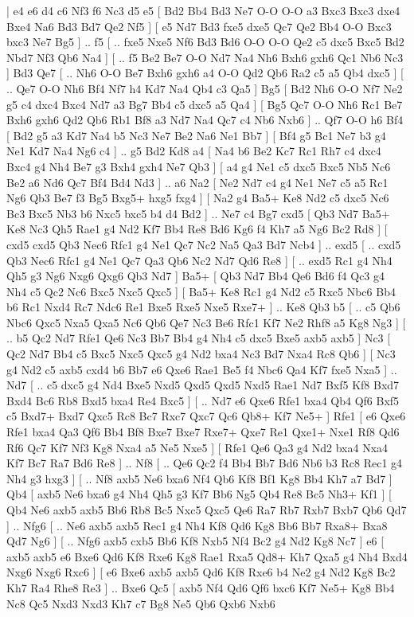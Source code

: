 \makegametitle 
|   e4   e6    d4   c6    Nf3   f6    Nc3   d5    e5 [  Bd2 Bb4  Bd3 Ne7  O-O O-O  a3 Bxc3  Bxc3 dxe4  Bxe4 Na6  Bd3 Bd7  Qe2 Nf5   ]  [  e5 Nd7  Bd3 fxe5  dxe5 Qc7  Qe2 Bb4  O-O Bxc3  bxc3 Ne7  Bg5   ] .. f5 [ .. fxe5  Nxe5 Nf6  Bd3 Bd6  O-O O-O  Qe2 c5  dxc5 Bxc5  Bd2 Nbd7  Nf3 Qb6  Na4   ]  [ .. f5  Be2 Be7  O-O Nd7  Na4 Nh6  Bxh6 gxh6  Qc1 Nb6  Nc3   ]  Bd3   Qe7 [ .. Nh6  O-O Be7  Bxh6 gxh6  a4 O-O  Qd2 Qb6  Ra2 c5  a5 Qb4  dxc5   ]  [ .. Qe7  O-O Nh6  Bf4 Nf7  h4 Kd7  Na4 Qb4  c3 Qa5   ]  Bg5 [  Bd2 Nh6  O-O Nf7  Ne2 g5  c4 dxc4  Bxc4 Nd7  a3 Bg7  Bb4 c5  dxc5 a5  Qa4   ]  [  Bg5 Qc7  O-O Nh6  Rc1 Be7  Bxh6 gxh6  Qd2 Qb6  Rb1 Bf8  a3 Nd7  Na4 Qc7  c4 Nb6  Nxb6   ] .. Qf7    O-O   h6    Bf4 [  Bd2 g5  a3 Kd7  Na4 b5  Nc3 Ne7  Be2 Na6  Ne1 Bb7   ]  [  Bf4 g5  Bc1 Ne7  b3 g4  Ne1 Kd7  Na4 Ng6  c4   ] .. g5    Bd2   Kd8    a4 [  Na4 b6  Be2 Kc7  Rc1 Rh7  c4 dxc4  Bxc4 g4  Nh4 Be7  g3 Bxh4  gxh4 Ne7  Qb3   ]  [  a4 g4  Ne1 c5  dxc5 Bxc5  Nb5 Nc6  Be2 a6  Nd6 Qc7  Bf4 Bd4  Nd3   ] .. a6    Na2 [  Ne2 Nd7  c4 g4  Ne1 Ne7  c5 a5  Rc1 Ng6  Qb3 Be7  f3 Bg5  Bxg5+ hxg5  fxg4   ]  [  Na2 g4  Ba5+ Ke8  Nd2 c5  dxc5 Nc6  Bc3 Bxc5  Nb3 b6  Nxc5 bxc5  b4 d4  Bd2   ] .. Ne7    c4   Bg7    cxd5 [  Qb3 Nd7  Ba5+ Ke8  Nc3 Qh5  Rae1 g4  Nd2 Kf7  Bb4 Re8  Bd6 Kg6  f4 Kh7  a5 Ng6  Bc2 Rd8   ]  [  cxd5 cxd5  Qb3 Nec6  Rfc1 g4  Ne1 Qc7  Nc2 Na5  Qa3 Bd7  Ncb4   ] .. exd5 [ .. cxd5  Qb3 Nec6  Rfc1 g4  Ne1 Qc7  Qa3 Qb6  Nc2 Nd7  Qd6 Re8   ]  [ .. exd5  Rc1 g4  Nh4 Qh5  g3 Ng6  Nxg6 Qxg6  Qb3 Nd7   ]  Ba5+ [  Qb3 Nd7  Bb4 Qe6  Bd6 f4  Qc3 g4  Nh4 c5  Qc2 Nc6  Bxc5 Nxc5  Qxc5   ]  [  Ba5+ Ke8  Rc1 g4  Nd2 c5  Rxc5 Nbc6  Bb4 b6  Rc1 Nxd4  Rc7 Ndc6  Re1 Bxe5  Rxe5 Nxe5  Rxe7+   ] .. Ke8    Qb3   b5 [ .. c5  Qb6 Nbc6  Qxc5 Nxa5  Qxa5 Nc6  Qb6 Qe7  Nc3 Be6  Rfc1 Kf7  Ne2 Rhf8  a5 Kg8  Ng3   ]  [ .. b5  Qc2 Nd7  Rfe1 Qe6  Nc3 Bb7  Bb4 g4  Nh4 c5  dxc5 Bxe5  axb5 axb5   ]  Nc3 [  Qc2 Nd7  Bb4 c5  Bxc5 Nxc5  Qxc5 g4  Nd2 bxa4  Nc3 Bd7  Nxa4 Rc8  Qb6   ]  [  Nc3 g4  Nd2 c5  axb5 cxd4  b6 Bb7  e6 Qxe6  Rae1 Be5  f4 Nbc6  Qa4 Kf7  fxe5 Nxa5   ] .. Nd7 [ .. c5  dxc5 g4  Nd4 Bxe5  Nxd5 Qxd5  Qxd5 Nxd5  Rae1 Nd7  Bxf5 Kf8  Bxd7 Bxd4  Bc6 Rb8  Bxd5 bxa4  Re4 Bxc5   ]  [ .. Nd7  e6 Qxe6  Rfe1 bxa4  Qb4 Qf6  Bxf5 c5  Bxd7+ Bxd7  Qxc5 Rc8  Bc7 Rxc7  Qxc7 Qc6  Qb8+ Kf7  Ne5+   ]  Rfe1 [  e6 Qxe6  Rfe1 bxa4  Qa3 Qf6  Bb4 Bf8  Bxe7 Bxe7  Rxe7+ Qxe7  Re1 Qxe1+  Nxe1 Rf8  Qd6 Rf6  Qc7 Kf7  Nf3 Kg8  Nxa4 a5  Ne5 Nxe5   ]  [  Rfe1 Qe6  Qa3 g4  Nd2 bxa4  Nxa4 Kf7  Bc7 Ra7  Bd6 Re8   ] .. Nf8 [ .. Qe6  Qc2 f4  Bb4 Bb7  Bd6 Nb6  b3 Rc8  Rec1 g4  Nh4 g3  hxg3   ]  [ .. Nf8  axb5 Ne6  bxa6 Nf4  Qb6 Kf8  Bf1 Kg8  Bb4 Kh7  a7 Bd7   ]  Qb4 [  axb5 Ne6  bxa6 g4  Nh4 Qh5  g3 Kf7  Bb6 Ng5  Qb4 Re8  Bc5 Nh3+  Kf1   ]  [  Qb4 Ne6  axb5 axb5  Bb6 Rb8  Bc5 Nxc5  Qxc5 Qe6  Ra7 Rb7  Rxb7 Bxb7  Qb6 Qd7   ] .. Nfg6 [ .. Ne6  axb5 axb5  Rec1 g4  Nh4 Kf8  Qd6 Kg8  Bb6 Bb7  Rxa8+ Bxa8  Qd7 Ng6   ]  [ .. Nfg6  axb5 cxb5  Bb6 Kf8  Nxb5 Nf4  Bc2 g4  Nd2 Kg8  Nc7   ]  e6 [  axb5 axb5  e6 Bxe6  Qd6 Kf8  Rxe6 Kg8  Rae1 Rxa5  Qd8+ Kh7  Qxa5 g4  Nh4 Bxd4  Nxg6 Nxg6  Rxc6   ]  [  e6 Bxe6  axb5 axb5  Qd6 Kf8  Rxe6 b4  Ne2 g4  Nd2 Kg8  Bc2 Kh7  Ra4 Rhe8  Re3   ] .. Bxe6    Qc5 [  axb5 Nf4  Qd6 Qf6  bxc6 Kf7  Ne5+ Kg8  Bb4 Nc8  Qc5 Nxd3  Nxd3 Kh7  c7 Bg8  Ne5 Qb6  Qxb6 Nxb6 